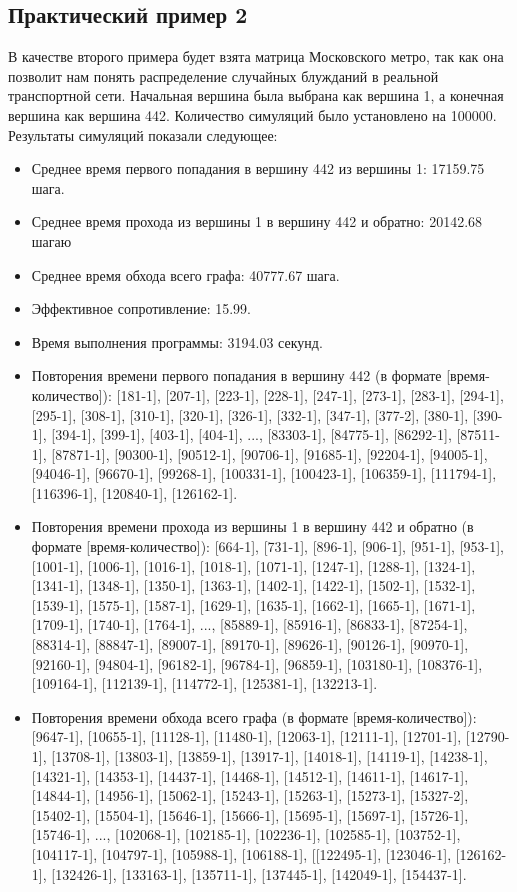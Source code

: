 \documentclass[utf8x]{G7-32} %
\begin{document}
\subsection{Практический пример 2}
В качестве второго примера будет взята матрица Московского метро, так как она позволит нам понять распределение случайных блужданий в реальной транспортной сети. Начальная вершина была выбрана как вершина 1, а конечная вершина как вершина 442. Количество симуляций было установлено на 100000. Результаты симуляций показали следующее:
\begin{itemize}
    \item Среднее время первого попадания в вершину 442 из вершины 1: 17159.75 шага.
    \item Среднее время прохода из вершины 1 в вершину 442 и обратно: 20142.68 шагаю
    \item Среднее время обхода всего графа: 40777.67 шага.
    \item Эффективное сопротивление: 15.99.
    \item Время выполнения программы: 3194.03 секунд.
    \item Повторения времени первого попадания в вершину 442 (в формате [время-количество]):
[181-1], [207-1], [223-1], [228-1], [247-1], [273-1], [283-1], [294-1], [295-1], [308-1], [310-1], [320-1], [326-1], [332-1], [347-1], [377-2], [380-1], [390-1], [394-1], [399-1], [403-1], [404-1], ..., [83303-1], [84775-1], [86292-1], [87511-1], [87871-1], [90300-1], [90512-1], [90706-1], [91685-1], [92204-1], [94005-1], [94046-1], [96670-1], [99268-1], [100331-1], [100423-1], [106359-1], [111794-1], [116396-1], [120840-1], [126162-1].
    \item Повторения времени прохода из вершины 1 в вершину 442 и обратно (в формате [время-количество]):
[664-1], [731-1], [896-1], [906-1], [951-1], [953-1], [1001-1], [1006-1], [1016-1], [1018-1], [1071-1], [1247-1], [1288-1], [1324-1], [1341-1], [1348-1], [1350-1], [1363-1], [1402-1], [1422-1], [1502-1], [1532-1], [1539-1], [1575-1], [1587-1], [1629-1], [1635-1], [1662-1], [1665-1], [1671-1], [1709-1], [1740-1], [1764-1], ..., [85889-1], [85916-1], [86833-1], [87254-1], [88314-1], [88847-1], [89007-1], [89170-1], [89626-1], [90126-1], [90970-1], [92160-1], [94804-1], [96182-1], [96784-1], [96859-1], [103180-1], [108376-1], [109164-1], [112139-1], [114772-1], [125381-1], [132213-1].
    \item Повторения времени обхода всего графа (в формате [время-количество]):
    [9647-1], [10655-1], [11128-1], [11480-1], [12063-1], [12111-1], [12701-1], [12790-1], [13708-1], [13803-1], [13859-1], [13917-1], [14018-1], [14119-1], [14238-1], [14321-1], [14353-1], [14437-1], [14468-1], [14512-1], [14611-1], [14617-1], [14844-1], [14956-1], [15062-1], [15243-1], [15263-1], [15273-1], [15327-2], [15402-1], [15504-1], [15646-1], [15666-1], [15695-1], [15697-1], [15726-1], [15746-1], ..., [102068-1], [102185-1], [102236-1], [102585-1], [103752-1], [104117-1], [104797-1], [105988-1], [106188-1], [[122495-1], [123046-1], [126162-1], [132426-1], [133163-1], [135711-1], [137445-1], [142049-1], [154437-1].
\end{itemize}
\end{document}
